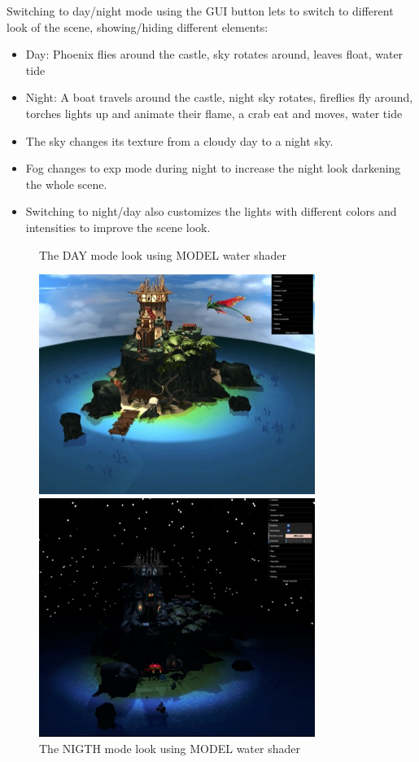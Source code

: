 \documentclass[10pt,a4paper]{article}
\begin{document}
Switching to day/night mode using the GUI button lets to switch to different look of the scene, showing/hiding different elements:

\begin{itemize}
 \item Day: Phoenix flies around  the castle, sky rotates around, leaves float,  water tide
 \item Night: A boat travels around the castle, night sky rotates, fireflies fly around, torches lights up and animate their flame, a crab eat and moves, water tide
\end{itemize}

\begin{itemize}
 \item The sky changes its texture from a cloudy day to a night sky.
 \item Fog changes to exp mode during night to increase the night look darkening the whole scene.
 \item Switching to night/day also customizes the lights with different colors and intensities to improve the scene look.
 \end{itemize}
 
 
\begin{figure}[H]
\centering
\caption{The DAY mode look using MODEL water shader}
\includegraphics[width=0.8\textwidth,keepaspectratio]{day_sea}
\caption{The NIGTH mode look using MODEL water shader}
\includegraphics[width=0.8\textwidth,keepaspectratio]{night_sea}
\end{figure}
 
\end{document}
